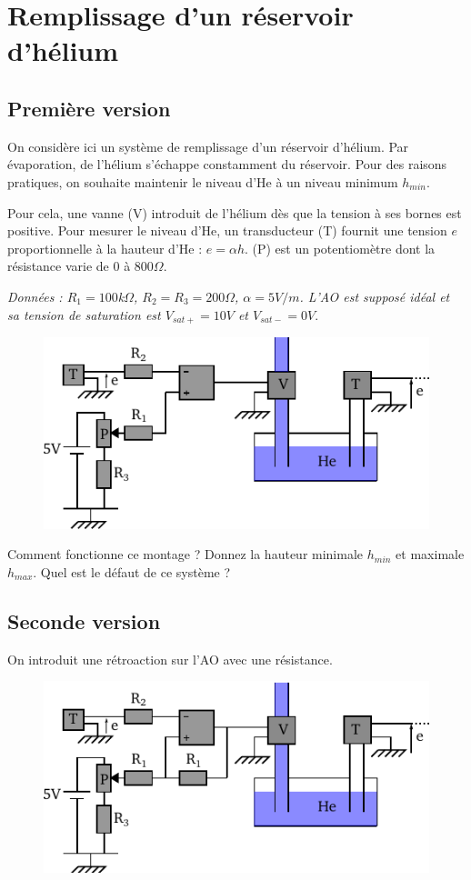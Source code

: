 \documentclass{report}
\begin{document}
\newpage

\section*{Remplissage d'un réservoir d'hélium}
\subsection*{Première version}
On considère ici un système de remplissage d'un réservoir d'hélium. Par évaporation, de l'hélium s'échappe constamment du réservoir. Pour des raisons pratiques, on souhaite maintenir le niveau d'He à un niveau minimum $h_{min}$.

Pour cela, une vanne (V) introduit de l'hélium dès que la tension à ses bornes est positive. Pour mesurer le niveau d'He, un transducteur (T) fournit une tension $e$ proportionnelle à la hauteur d'He : $e= \alpha h$. (P) est un potentiomètre dont la résistance varie de $0$ à $800\Omega$.

\textit{Données : $R_{1} = 100$k$\Omega$, $R_{2}=R_{3}=200\Omega$, $\alpha = 5V/m$. L'AO est supposé idéal et sa tension de saturation est $V_{sat+}=10V$ et $V_{sat-}=0V.$}

\begin{figure}[!h]
\centering
\includegraphics[width=0.8\linewidth]{circuit_10.pdf}
\end{figure}

Comment fonctionne ce montage ? Donnez la hauteur minimale $h_{min}$ et maximale $h_{max}$. Quel est le défaut de ce système ?

\subsection*{Seconde version}
On introduit une rétroaction sur l'AO avec une résistance.

\begin{figure}[!h]
\centering
\includegraphics[width=0.8\linewidth]{circuit_11.pdf}
\end{figure}
\end{document}
